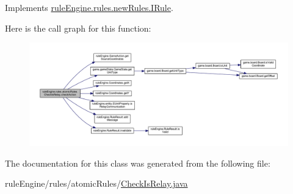 Implements \mbox{\hyperlink{interfacerule_engine_1_1rules_1_1new_rules_1_1_i_rule_a72ce29a47d7a5fba75a09444a50a481e}{rule\+Engine.\+rules.\+new\+Rules.\+I\+Rule}}.

Here is the call graph for this function\+:
\nopagebreak
\begin{figure}[H]
\begin{center}
\leavevmode
\includegraphics[width=350pt]{classrule_engine_1_1rules_1_1atomic_rules_1_1_check_is_relay_a32d1e800df813f84e497548baff92cd1_cgraph}
\end{center}
\end{figure}


The documentation for this class was generated from the following file\+:\begin{DoxyCompactItemize}
\item 
rule\+Engine/rules/atomic\+Rules/\mbox{\hyperlink{_check_is_relay_8java}{Check\+Is\+Relay.\+java}}\end{DoxyCompactItemize}
